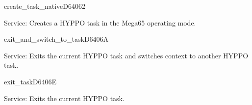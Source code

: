 \begin{hyppotrap}{create\_task\_native}{D640}{62}
\item [Service:]
  Creates a HYPPO task in the Mega65 operating mode.
\notimplemented
\end{hyppotrap}


\begin{hyppotrap}{exit\_and\_switch\_to\_task}{D640}{6A}
\item [Service:]
  Exits the current HYPPO task and switches context to another HYPPO task.
\notimplemented
\end{hyppotrap}


\begin{hyppotrap}{exit\_task}{D640}{6E}
\item [Service:]
  Exits the current HYPPO task. %
\notimplemented
\end{hyppotrap}


